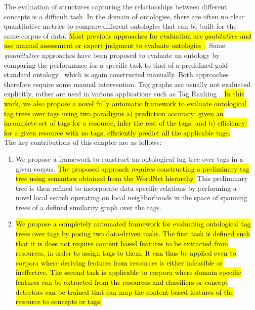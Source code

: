 {%

The evaluation of structures capturing the relationships between different concepts is a difficult task. In the domain of ontologies, there are often no clear quantitative metrics to compare different ontologies that can be built for the same corpus of data. \hl{Most previous approaches for evaluation are $qualitative$ and use manual assessment or expert judgment to evaluate ontologies~{\cite{buitelaar2005ontology}}{\cite{feiliang2012demo}}{\cite{ren2012cheap}}}. Some {\em quantitative} approaches have been proposed to evaluate an ontology by comparing the performance for a specific task to that of a predefined gold standard ontology~\cite{porzel2004task} which is again constructed manually. Both approaches therefore require some manual intervention. Tag graphs are usually not evaluated explicitly, rather are used in various applications such as Tag Ranking~\cite{liu2009tag}. \hl{In this work, we also propose a novel fully automatic framework to evaluate ontological tag trees over tags using two paradigms a) prediction accuracy: given an incomplete set of tags for a resource, infer the rest of the tags, and b) efficiency: for a given resource with no tags, efficiently predict all the applicable tags. } \\
\indent The key contributions of this chapter are as follows:
\begin{enumerate}
	\item We propose a framework to construct an ontological tag tree over tags in a given corpus. \hl{The proposed approach requires constructing a preliminary tag tree using semantics obtained from the WordNet hierarchy.} This preliminary tree is then refined to incorporate data specific relations by performing a novel local search operating on local neighborhoods in the space of spanning trees of a defined similarity graph over the tags. 
	\item \hl{We propose a completely automated framework for evaluating ontological tag trees over tags by posing two data-driven tasks. The first task is defined such that it is does not require content based features to be extracted from resources, in order to assign tags to them. It can thus be applied even to corpora where deriving features from resources is either infeasible or ineffective. The second task is applicable to corpora where domain specific features can be extracted from the resources and classifiers or concept detectors can be trained that can map the content based features of the resource to concepts or tags. 
}
\end{enumerate}}
